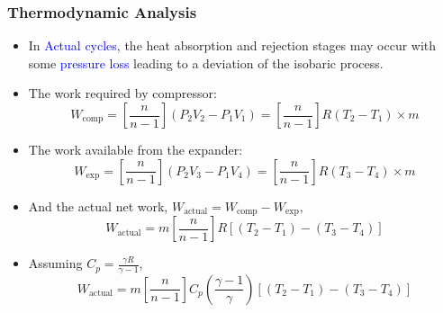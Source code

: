 \documentclass[10pt,compress]{beamer}
\newcommand{\frc}{\displaystyle\frac}
\begin{document}
\begin{frame}
 \frametitle{Thermodynamic Analysis}
    \begin{itemize}
     \item <1-> In \textcolor{blue}{Actual cycles}, the heat absorption and rejection stages may occur with some \textcolor{blue}{pressure loss} leading to a deviation of the isobaric process.
     \item <2-> The work required by compressor:
      \begin{displaymath}
       W_{\text{comp}} = \left[\frc{n}{n-1}\right] \left(P_{2}V_{2}-P_{1}V_{1}\right) = \left[\frc{n}{n-1}\right] R \left(T_{2}-T_{1}\right) \times m
      \end{displaymath}
     \item <3-> The work available from the expander:
      \begin{displaymath}
       W_{\text{exp}} = \left[\frc{n}{n-1}\right] \left(P_{2}V_{3}-P_{1}V_{4}\right) = \left[\frc{n}{n-1}\right] R \left(T_{3}-T_{4}\right) \times m
      \end{displaymath}
     \item <4-> And the actual net work, $W_\text{actual} = W_{\text{comp}} - W_{\text{exp}}$,
      \begin{displaymath}
       W_{\text{actual}} = m\left[\frc{n}{n-1}\right]R\left[\left(T_{2}-T_{1}\right)-\left(T_{3}-T_{4}\right)\right]
      \end{displaymath}
     \item <5-> Assuming $C_{p} = \frc{\gamma R}{\gamma - 1}$,
      \begin{equation}
       W_{\text{actual}} = m \left[\frc{n}{n-1}\right] C_{p} \left(\frc{\gamma - 1}{\gamma}\right) \left[\left(T_{2}-T_{1}\right)-\left(T_{3}-T_{4}\right)\right]
      \end{equation}
    \end{itemize}

\end{frame}
\end{document}
